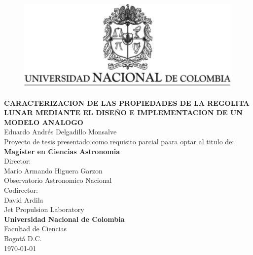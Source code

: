 \documentclass[12pt]{article}
\begin{document}
\newpage
\begin{titlepage}
    \thispagestyle{empty}
    \begin{center}
        \begin{figure}
        \centering%
        \includegraphics{images/EscudoUN.png}
    \end{figure}
    
    \vspace{1cm}
    
        \textbf{CARACTERIZACION DE LAS PROPIEDADES DE LA REGOLITA LUNAR MEDIANTE EL DISEÑO E IMPLEMENTACION DE UN MODELO ANALOGO}\\[1in]    
    Eduardo Andrés Delgadillo Monsalve \\  [1.5 cm]
 Proyecto de tesis presentado como requisito parcial paara optar al titulo de:\\[3mm] \textbf {\large{Magister en Ciencias Astronomia}}\\[1cm]
 Director:\\[3mm] Mario Armando Higuera Garzon\\[1mm] Observatorio Astronomico Nacional\\[1cm]
 Codirector:\\[3mm] David Ardila\\ Jet Propulsion Laboratory\\[1in]
 \textbf{Universidad Nacional de Colombia  }\\
   Facultad de Ciencias\\
   Bogotá D.C.\\
   \today
    \end{center}
\end{titlepage}

\newpage
\thispagestyle{empty}
\tableofcontents
\thispagestyle{empty}
\newpage



\newpage

\setcounter{page}{1}
\end{document}
